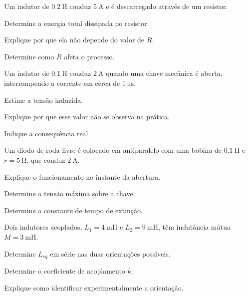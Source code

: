 \blocoaprofundamento
\begin{questao}[3]{}

Um indutor de $\SI{0.2}{\henry}$ conduz $\SI{5}{\ampere}$ e é descarregado
através de um resistor.
\begin{itensq}
\item Determine a energia total dissipada no resistor.
\item Explique por que ela não depende do valor de $R$.
\item Determine como $R$ afeta o processo.
\end{itensq}


\end{questao}
\begin{questao}[3]{}

Um indutor de $\SI{0.1}{\henry}$ conduz $\SI{2}{\ampere}$ quando uma chave
mecânica é aberta, interrompendo a corrente em cerca de
$\SI{1}{\micro\second}$.
\begin{itensq}
\item Estime a tensão induzida.
\item Explique por que esse valor não se observa na prática.
\item Indique a consequência real.
\end{itensq}


\end{questao}
\begin{questao}[3]{}

Um diodo de roda livre é colocado em antiparalelo com uma bobina de
$\SI{0.1}{\henry}$ e $r=\SI{5}{\ohm}$, que conduz $\SI{2}{\ampere}$.
\begin{itensq}
\item Explique o funcionamento no instante da abertura.
\item Determine a tensão máxima sobre a chave.
\item Determine a constante de tempo de extinção.
\end{itensq}


\end{questao}
\begin{questao}[3]{}

Dois indutores acoplados, $L_1=\SI{4}{\milli\henry}$ e
$L_2=\SI{9}{\milli\henry}$, têm indutância mútua $M=\SI{3}{\milli\henry}$.
\begin{itensq}
\item Determine $L_{eq}$ em série nas duas orientações possíveis.
\item Determine o coeficiente de acoplamento $k$.
\item Explique como identificar experimentalmente a orientação.
\end{itensq}


\end{questao}
